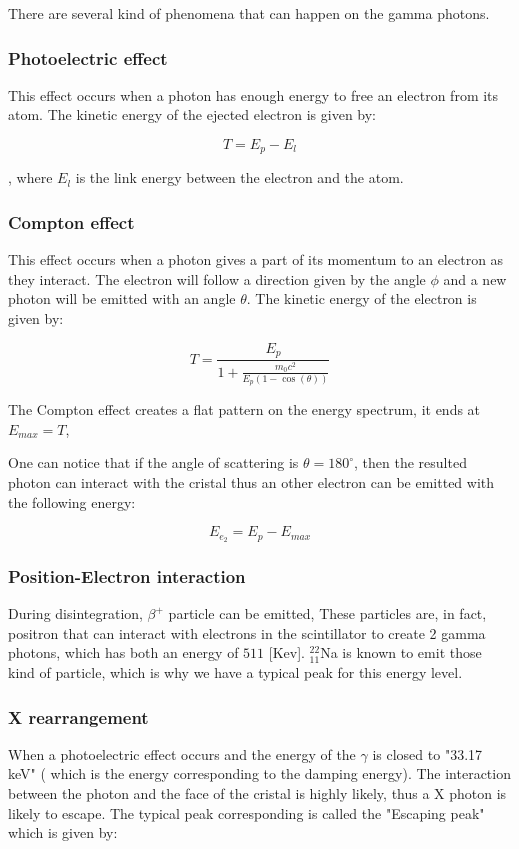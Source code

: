 \documentclass[a4paper,12pt,oneside]{article}
\begin{document}
There are several kind of phenomena that can happen on the gamma photons.
\subsubsection{Photoelectric effect}
This effect occurs when a photon has enough energy to free an electron from its atom. The kinetic energy of the ejected electron is given by:

$$T=E_p - E_l$$

, where $E_l$ is the link energy between the electron and the atom.

\subsubsection{Compton effect}
This effect occurs when a photon gives a part of its momentum to an 
electron as they interact. The electron will follow a direction given 
by the angle $\phi$ and a new photon will be emitted with an angle $\theta$.
The kinetic energy of the electron is given by:

$$T=\frac{E_p}{1+\frac{m_0c^2}{E_p(1-\cos(\theta))}}$$

The Compton effect creates a flat pattern on the energy spectrum, it ends at $E_{max}=T$,

One can notice that if the angle of scattering is $\theta=180^{\circ}$, then the resulted photon can interact with the cristal thus an other electron can be emitted with the following energy:

$$E_{e_2}=E_p-E_{max}$$

\subsubsection{Position-Electron interaction}
During disintegration, $\beta^+$ particle can be emitted, These 
particles are, in fact, positron that can interact with electrons in 
the scintillator to create 2 gamma photons, which has both an energy of $511$ [Kev].
$^{22}_{11}$Na is known to emit those kind of particle, which is why we have a typical peak for this energy level.

\subsubsection{X rearrangement}
When a photoelectric effect occurs and the energy of the $\gamma$ is closed to "33.17 keV" ( which is the energy corresponding to the damping energy). The interaction between the photon and the face of the cristal is highly likely, thus a X photon is likely to escape. The typical peak corresponding is called the "Escaping peak" which is given by:
\end{document}
